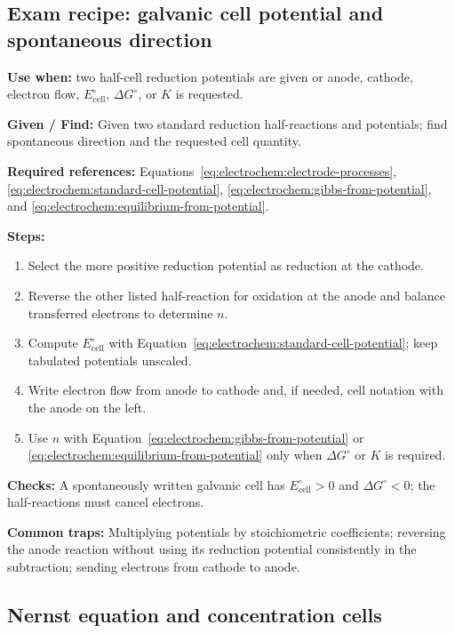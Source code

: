 \subsection{Exam recipe: galvanic cell potential and spontaneous direction}
\textbf{Use when:} two half-cell reduction potentials are given or anode, cathode, electron flow, \(E^\circ_{\mathrm{cell}}\), \(\Delta G^\circ\), or \(K\) is requested.

\textbf{Given / Find:} Given two standard reduction half-reactions and potentials; find spontaneous direction and the requested cell quantity.

\textbf{Required references:} Equations~\eqref{eq:electrochem:electrode-processes}, \eqref{eq:electrochem:standard-cell-potential}, \eqref{eq:electrochem:gibbs-from-potential}, and \eqref{eq:electrochem:equilibrium-from-potential}.


\textbf{Steps:}
\begin{enumerate}
    \item Select the more positive reduction potential as reduction at the cathode.
    \item Reverse the other listed half-reaction for oxidation at the anode and balance transferred electrons to determine \(n\).
    \item Compute \(E^\circ_{\mathrm{cell}}\) with Equation~\eqref{eq:electrochem:standard-cell-potential}; keep tabulated potentials unscaled.
    \item Write electron flow from anode to cathode and, if needed, cell notation with the anode on the left.
    \item Use \(n\) with Equation~\eqref{eq:electrochem:gibbs-from-potential} or \eqref{eq:electrochem:equilibrium-from-potential} only when \(\Delta G^\circ\) or \(K\) is required.
\end{enumerate}

\textbf{Checks:} A spontaneously written galvanic cell has \(E^\circ_{\mathrm{cell}}>0\) and \(\Delta G^\circ<0\); the half-reactions must cancel electrons.

\textbf{Common traps:} Multiplying potentials by stoichiometric coefficients; reversing the anode reaction without using its reduction potential consistently in the subtraction; sending electrons from cathode to anode.

\subsection{Nernst equation and concentration cells}

